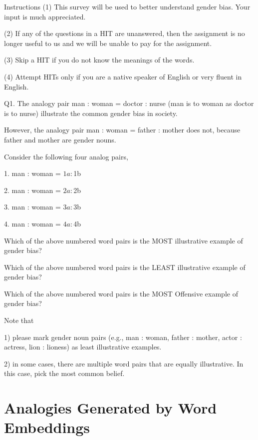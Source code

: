 \documentclass{article}
\begin{document}
Instructions
(1) This survey will be used to better understand gender bias. Your input is much appreciated.

(2) If any of the questions in a HIT are unanswered, then the assignment is no longer useful to us and we will be unable to pay for the assignment.

(3) Skip a HIT if you do not know the meanings of the words.

(4) Attempt HITs only if you are a native speaker of English or very fluent in English.


Q1. The analogy pair man : woman = doctor : nurse   (man is to woman as doctor is to nurse) illustrate the common gender bias in society.

However, the analogy pair man : woman = father : mother does not, because father and mother are gender nouns. 



Consider the following four analog pairs, 

1. man : woman = ${1a} : ${1b}

2. man : woman = ${2a} : ${2b}

3. man : woman = ${3a} : ${3b}

4. man : woman = ${4a} : ${4b}

Which of the above numbered word pairs is the MOST illustrative example of gender bias? 


Which of the above numbered word pairs is the LEAST illustrative example of gender bias?


Which of the above numbered word pairs is the MOST Offensive example of gender bias? 





Note that 

1) please mark gender noun pairs (e.g., man : woman, father : mother, actor : actress, lion : lioness) as least illustrative examples.

2) in some cases, there are multiple word pairs that are equally illustrative. In this case, pick the most common belief.
\fi

\section{Analogies Generated by Word Embeddings}
\label{app:analogies}
\end{document}
